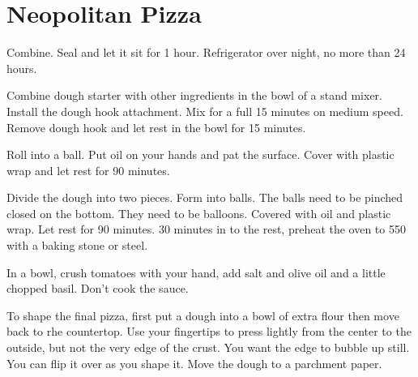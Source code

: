 \section{Neopolitan Pizza}
\begin{recipe}



Combine. Seal and let it sit for 1 hour. Refrigerator over night, no more than 24 hours. 


Combine dough starter with other ingredients in the bowl of a stand mixer. Install the dough hook attachment. Mix for a full 15 minutes on medium speed. Remove dough hook and let rest in the bowl for 15 minutes. 

Roll into a ball. Put oil on your hands and pat the surface. Cover with plastic wrap and let rest for 90 minutes. 

Divide the dough into two pieces. Form into balls. The balls need to be pinched closed on the bottom. They need to be balloons. Covered with oil and plastic wrap. Let rest for 90 minutes. 30 minutes in to the rest, preheat the oven to 550\degree{} with a baking stone or steel. 


In a bowl, crush tomatoes with your hand, add salt and olive oil and a little chopped basil. Don't cook the sauce.

To shape the final pizza, first put a dough into a bowl of extra flour then move back to rhe countertop. Use your fingertips to press lightly from the center to the outside, but not the very edge of the crust. You want the edge to bubble up still. You can flip it over as you shape it. Move the dough to a parchment paper. 


\end{recipe}
